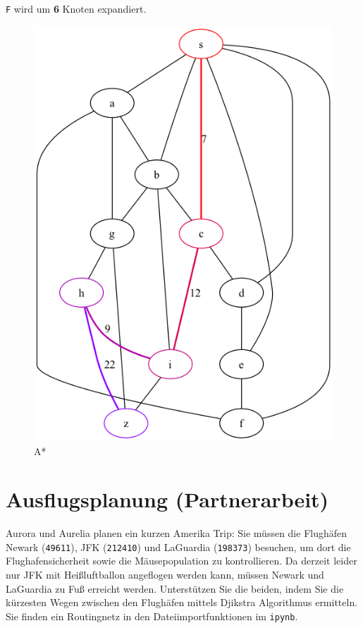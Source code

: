 \documentclass[a4paper,11pt]{report}
\begin{document}
\texttt{F} wird um \textbf{6} Knoten expandiert.

\begin{figure}[htbp]
    \centering
    \includegraphics[height=0.2\textheight]{astar}
    \caption{A*}
    \label{fig:astar_graph}
\end{figure}

\newpage

\chapter{Ausflugsplanung (Partnerarbeit)}

Aurora und Aurelia planen ein kurzen Amerika Trip:
Sie müssen die Flughäfen Newark (\texttt{49611}), JFK (\texttt{212410}) und LaGuardia (\texttt{198373}) besuchen, um dort die Flughafensicherheit sowie die Mäusepopulation zu kontrollieren.
Da derzeit leider nur JFK mit Heißluftballon angeflogen werden kann, müssen Newark und LaGuardia zu Fuß erreicht werden.
Unterstützen Sie die beiden, indem Sie die kürzesten Wegen zwischen den Flughäfen mittels Djikstra Algorithmus ermitteln.
Sie finden ein Routingnetz in den Dateiimportfunktionen im \texttt{ipynb}.
\end{document}
